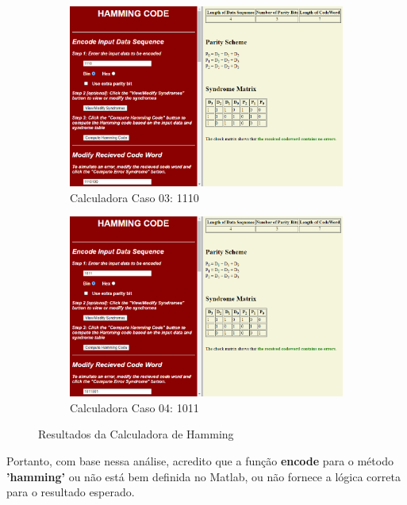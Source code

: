 \documentclass{article}
\begin{document}
\begin{figure}[htbp]
\begin{subfigure}[b]{0.22\textwidth}
        \includegraphics[width=\textwidth]{4bitsCaso03_Calculadora.png}
        \caption{Calculadora Caso 03: 1110}
        \label{fig:imagem3}
    \end{subfigure}
    \hfill
    \begin{subfigure}[b]{0.22\textwidth}
        \includegraphics[width=\textwidth]{4bitsCaso04_Calculadora.png}
        \caption{Calculadora Caso 04: 1011}
        \label{fig:imagem4}
    \end{subfigure}
    
    \caption{Resultados da Calculadora de Hamming}
    \label{fig:conjunto-imagens}
\end{figure}

Portanto, com base nessa análise, acredito que a função \textbf{encode} para o método \textbf{'hamming'} ou não está bem definida no Matlab, ou não fornece a lógica correta para o resultado esperado.
\end{document}
